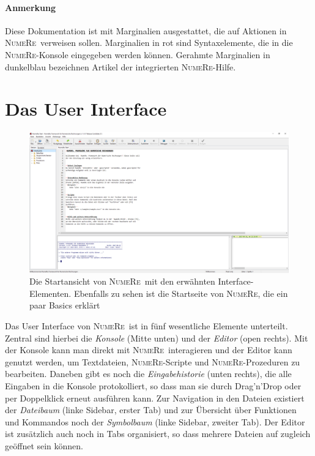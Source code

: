 \documentclass[DIV=14,headsepline,footsepline]{scrbook}
\newcommand{\NR}{\textsc{Nu\-me\-Re}}
\begin{document}
			\paragraph{Anmerkung}
				Diese Dokumentation ist mit Marginalien ausgestattet, die auf Aktionen in \NR\ verweisen sollen. Marginalien in rot sind Syntaxelemente, die in die \NR-Konsole eingegeben werden können. Gerahmte Marginalien in dunkelblau bezeichnen Artikel der integrierten \NR-Hilfe.
			\section{Das User Interface}
				\begin{figure}[htb]%
					\centering
					\includegraphics[width=\textwidth]{_graphics/ui.png}
					\caption{Die Startansicht von \NR\ mit den erwähnten Interface-Elementen. Ebenfalls zu sehen ist die Startseite von \NR, die ein paar Basics erklärt}
					\label{fig:ui}
				\end{figure}	
				Das User Interface von \NR\ ist in fünf wesentliche Elemente unterteilt. Zentral sind hierbei die \emph{Konsole} (Mitte unten) und der \emph{Editor} (open rechts). Mit der Konsole kann man direkt mit \NR\ interagieren und der Editor kann genutzt werden, um Textdateien, \NR-Scripte und \NR-Prozeduren zu bearbeiten. Daneben gibt es noch die \emph{Eingabehistorie} (unten rechts), die alle Eingaben in die Konsole protokolliert, so dass man sie durch Drag'n'Drop oder per Doppelklick erneut ausführen kann. Zur Navigation in den Dateien existiert der \emph{Dateibaum} (linke Sidebar, erster Tab) und zur Übersicht über Funktionen und Kommandos noch der \emph{Symbolbaum} (linke Sidebar, zweiter Tab). Der Editor ist zusätzlich auch noch in Tabs organisiert, so dass mehrere Dateien auf zugleich geöffnet sein können.
				
\end{document}
